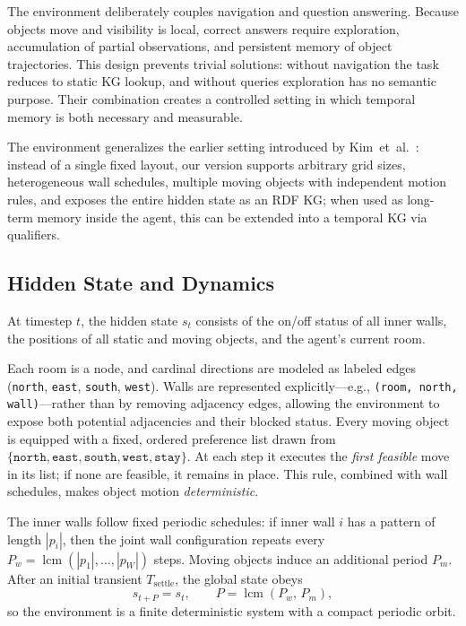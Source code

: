 \documentclass[runningheads]{llncs}
\begin{document}
The environment deliberately couples navigation and question answering. Because objects move and visibility is local, correct answers require exploration, accumulation of partial observations, and persistent memory of object trajectories. This design prevents trivial solutions: without navigation the task reduces to static KG lookup, and without queries exploration has no semantic purpose. Their combination creates a controlled setting in which temporal memory is both necessary and measurable.

The environment generalizes the earlier setting introduced by
Kim~et~al.~\cite{10.1609/aaai.v37i1.25075}: instead of a single fixed layout,
our version supports arbitrary grid sizes, heterogeneous wall schedules,
multiple moving objects with independent motion rules, and exposes the entire hidden state as an RDF KG; when used as long-term memory inside the agent, this can be extended into a temporal KG via qualifiers.

\subsection{Hidden State and Dynamics}

At timestep $t$, the hidden state $s_t$ consists of the on/off status of all inner walls, the positions of all static and moving objects, and the agent's current room.

Each room is a node, and cardinal directions are modeled as labeled edges
(\texttt{north}, \texttt{east}, \texttt{south}, \texttt{west}). Walls are
represented explicitly—e.g., \texttt{(room, north, wall)}—rather than by removing
adjacency edges, allowing the environment to expose both potential adjacencies
and their blocked status. Every moving object is equipped with a
fixed, ordered preference list drawn from
$\{\texttt{north},\texttt{east},\texttt{south},\texttt{west},\texttt{stay}\}$.
At each step it executes the \emph{first feasible} move in its list;
if none are feasible, it remains in place. This rule, combined with wall
schedules, makes object motion \emph{deterministic}.

The inner walls follow fixed periodic schedules: if inner wall $i$ has a
pattern of length $|p_i|$, then the joint wall configuration repeats every
$P_w = \operatorname{lcm}(|p_1|,\dots,|p_W|)$ steps. Moving objects induce an
additional period $P_m$. After an initial transient $T_{\text{settle}}$, the
global state obeys
\[
  s_{t+P} = s_t, \qquad P = \operatorname{lcm}(P_w,\, P_m),
\]
so the environment is a finite deterministic system with a compact periodic
orbit.
\end{document}
